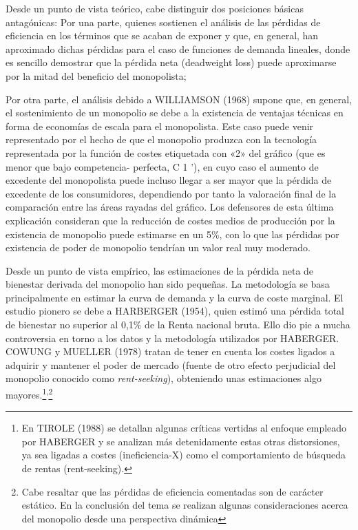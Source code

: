 \documentclass[10pt,a4paper]{article}
\begin{document}
Desde un punto de vista teórico, cabe distinguir dos posiciones básicas antagónicas: 
	Por una parte, quienes sostienen el análisis de las pérdidas de eficiencia en los términos que se acaban de exponer y que, en general, han aproximado dichas pérdidas para el caso de funciones de demanda lineales, donde es sencillo demostrar que la pérdida neta (deadweight loss) puede aproximarse por la mitad del beneficio del monopolista; 

    
	Por otra parte, el análisis debido a WILLIAMSON (1968) supone que, en general, el sostenimiento de un monopolio se debe a la existencia de ventajas técnicas en forma de economías de escala para el monopolista. Este caso puede venir representado por el hecho de que el monopolio produzca con la tecnología representada por la función de costes etiquetada con «2» del gráfico  (que es menor que bajo competencia- perfecta, C 1 '), en cuyo caso el aumento de excedente del monopolista puede incluso llegar a ser mayor que la pérdida de excedente de los consumidores, dependiendo por tanto la valoración final de la comparación entre las áreas rayadas del gráfico. Los defensores de esta última explicación consideran que la reducción de costes medios de producción por la existencia de monopolio puede estimarse en un 5\%, con lo que las pérdidas por existencia de poder de monopolio tendrían un valor real muy moderado.
 
	Desde un punto de vista empírico, las estimaciones de la pérdida neta de bienestar derivada del monopolio han sido pequeñas. La metodología se basa principalmente en estimar la curva de demanda y la curva de coste marginal. El estudio pionero se debe a HARBERGER (1954), quien estimó una pérdida total de bienestar no superior al 0,1\% de la Renta nacional bruta. Ello dio pie a mucha controversia en torno a los datos y la metodología utilizados por HABERGER.  COWUNG y MUELLER (1978) tratan de tener en cuenta los costes ligados a adquirir y mantener el poder de mercado (fuente de otro efecto perjudicial del monopolio conocido como \textit{rent-seeking}), obteniendo unas estimaciones algo mayores.\footnote{%
	    En TIROLE (1988) se detallan algunas críticas vertidas al enfoque empleado por HABERGER y se analizan más detenidamente estas otras distorsiones, ya sea ligadas a costes (ineficiencia-X) como el comportamiento de búsqueda de rentas (rent-seeking).
	}\textsuperscript{,}\footnote{%
        Cabe resaltar que las pérdidas de eficiencia comentadas son de carácter estático. En la conclusión del tema se realizan algunas consideraciones acerca del monopolio desde una perspectiva dinámica
    }
\end{document}

